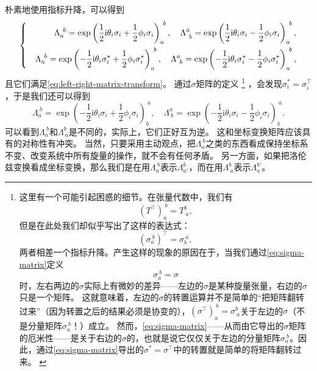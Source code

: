 \documentclass[hyperref, UTF8, a4paper]{ctexart}
\newcommand*{\ii}{\mathrm{i}}
\newenvironment{bigcase}{\left\{\quad\begin{aligned}}{\end{aligned}\right.}
\begin{document}
朴素地使用指标升降，可以得到
\begin{equation}
    \begin{bigcase}
        \Lambda_a^{\ b} = \exp \left( \frac{1}{2} \ii \theta_i \sigma_i + \frac{1}{2} \phi_i \sigma_i \right)_a^{\ b}, \quad \Lambda^{\dot{a}}_{\ \dot{b}} = \exp \left( \frac{1}{2} \ii \theta_i \sigma_i - \frac{1}{2} \phi_i \sigma_i \right)_a^{\ b}, \\
        \Lambda_{\dot{a}}^{\ \dot{b}} = \exp \left( - \frac{1}{2} \ii \theta_i \sigma_i^* + \frac{1}{2} \phi_i \sigma_i^* \right)_a^{\ b}, \quad \Lambda^{a}_{\ b} = \exp \left( - \frac{1}{2} \ii \theta_i \sigma_i^* - \frac{1}{2} \phi_i \sigma_i^* \right)_a^{\ b},
        \label{eq:lorentz-transform-on-spinors}
    \end{bigcase}
\end{equation}
且它们满足\eqref{eq:left-right-matrix-transform}。
通过$\sigma$矩阵的定义%
\footnote{这里有一个可能引起困惑的细节。在张量代数中，我们有
\[
    (T^\top)_a^{\ b} = T^b_{\ a},
\]
但是在此处我们却似乎写出了这样的表达式：
\[
    (\sigma_a^{\ b})^\top = \sigma_b^{\ a},
\]
两者相差一个指标升降。产生这样的现象的原因在于，当我们通过\eqref{eq:sigma-matrix}定义
\[
    \sigma_a^{\ b} = \sigma
\]
时，左右两边的$\sigma$实际上有微妙的差异——左边的$\sigma$是某种旋量张量，右边的$\sigma$只是一个矩阵。
这就意味着，左边的$\sigma$的转置运算并不是简单的“把矩阵翻转过来”（因为转置之后的结果必须是协变的），$(\sigma^\top)_a^{\ b} = \sigma^b_{\ a}$关于左边的$\sigma$（不是分量矩阵$\sigma_a^{\ b}$！）成立。
然而，\eqref{eq:sigma-matrix}——从而由它导出的$\sigma$矩阵的厄米性——是关于右边的$\sigma$的，也就是说它仅仅关于左边的分量矩阵$\sigma_a^{\ b}$。因此，通过\eqref{eq:sigma-matrix}导出的$\sigma^*=\sigma^\top$中的转置就是简单的将矩阵翻转过来。
\label{note:confusion-by-transpose}
}%
，会发现$\sigma_i^* = \sigma_i^\top$，于是我们还可以得到
\begin{equation}
    \Lambda_{\dot{a}}^{\ \dot{b}} = \exp \left( - \frac{1}{2} \ii \theta_i \sigma_i + \frac{1}{2} \phi_i \sigma_i \right)_b^{\ a}, \quad \Lambda^a_{\ b} = \exp \left( - \frac{1}{2} \ii \theta_i \sigma_i - \frac{1}{2} \phi_i \sigma_i \right)_b^{\ a}.
\end{equation}
可以看到$\Lambda_a^{\ b}$和$\Lambda^b_{\ a}$是不同的，实际上，它们正好互为逆。
这和坐标变换矩阵应该具有的对称性有冲突。
当然，只要采用主动观点，把$\Lambda_a^{\ b}$之类的东西看成保持坐标系不变、改变系统中所有旋量的操作，就不会有任何矛盾。
另一方面，如果把洛伦兹变换看成坐标变换，那么我们是在用$\Lambda_a^{\ b}$表示$\Lambda_{a'}^b$，而在用$\Lambda^b_{\ a}$表示$\Lambda_a^{b'}$。
\end{document}

